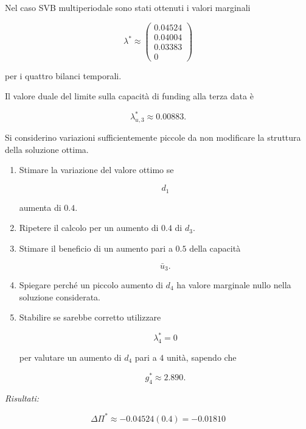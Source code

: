 \begin{exercise}

\label{ex:cap12-proposto-sensitivita}

Nel caso SVB multiperiodale sono stati ottenuti i valori marginali

\[
\lambda^*
\approx
\begin{pmatrix}
0.04524\\
0.04004\\
0.03383\\
0
\end{pmatrix}
\]

per i quattro bilanci temporali.

Il valore duale del limite sulla capacit\`a di funding alla terza data \`e

\[
\lambda_{u,3}^*
\approx
0.00883.
\]

Si considerino variazioni sufficientemente piccole da non modificare la
struttura della soluzione ottima.

\begin{enumerate}

\item Stimare la variazione del valore ottimo se

\[
d_1
\]

aumenta di $0.4$.

\item Ripetere il calcolo per un aumento di $0.4$ di $d_3$.

\item Stimare il beneficio di un aumento pari a $0.5$ della capacit\`a

\[
\bar u_3.
\]

\item Spiegare perch\'e un piccolo aumento di $d_4$ ha valore marginale nullo
nella soluzione considerata.

\item Stabilire se sarebbe corretto utilizzare

\[
\lambda_4^*=0
\]

per valutare un aumento di $d_4$ pari a $4$ unit\`a, sapendo che

\[
g_4^*\approx2.890.
\]

\end{enumerate}

\end{exercise}

\noindent
\textit{Risultati:}

\[
\Delta\Pi^*
\approx
-0.04524(0.4)
=
-0.01810
\]

